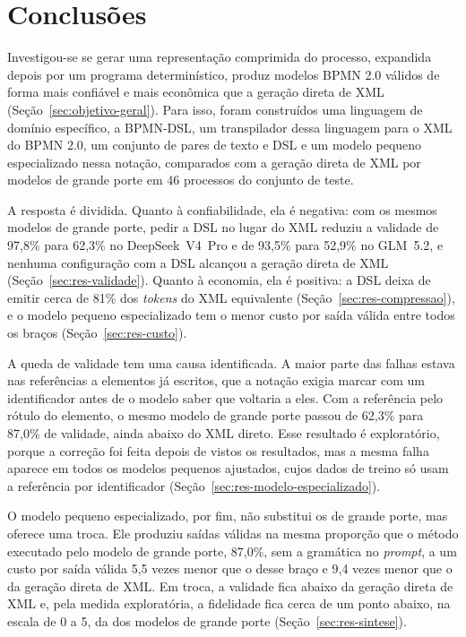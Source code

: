\chapter{Conclusões}\label{chap:conclusoes-e-trabalhos-futuros}

Investigou-se se gerar uma representação comprimida do processo, expandida depois por um programa determinístico, produz modelos BPMN 2.0 válidos de forma mais confiável e mais econômica que a geração direta de XML (Seção~\ref{sec:objetivo-geral}). Para isso, foram construídos uma linguagem de domínio específico, a BPMN-DSL, um transpilador dessa linguagem para o XML do BPMN 2.0, um conjunto de pares de texto e DSL e um modelo pequeno especializado nessa notação, comparados com a geração direta de XML por modelos de grande porte em 46 processos do conjunto de teste.

A resposta é dividida. Quanto à confiabilidade, ela é negativa: com os mesmos modelos de grande porte, pedir a DSL no lugar do XML reduziu a validade de 97,8\% para 62,3\% no DeepSeek~V4~Pro e de 93,5\% para 52,9\% no GLM~5.2, e nenhuma configuração com a DSL alcançou a geração direta de XML (Seção~\ref{sec:res-validade}). Quanto à economia, ela é positiva: a DSL deixa de emitir cerca de 81\% dos \textit{tokens} do XML equivalente (Seção~\ref{sec:res-compressao}), e o modelo pequeno especializado tem o menor custo por saída válida entre todos os braços (Seção~\ref{sec:res-custo}).

A queda de validade tem uma causa identificada. A maior parte das falhas estava nas referências a elementos já escritos, que a notação exigia marcar com um identificador antes de o modelo saber que voltaria a eles. Com a referência pelo rótulo do elemento, o mesmo modelo de grande porte passou de 62,3\% para 87,0\% de validade, ainda abaixo do XML direto. Esse resultado é exploratório, porque a correção foi feita depois de vistos os resultados, mas a mesma falha aparece em todos os modelos pequenos ajustados, cujos dados de treino só usam a referência por identificador (Seção~\ref{sec:res-modelo-especializado}).

O modelo pequeno especializado, por fim, não substitui os de grande porte, mas oferece uma troca. Ele produziu saídas válidas na mesma proporção que o método executado pelo modelo de grande porte, 87,0\%, sem a gramática no \textit{prompt}, a um custo por saída válida 5,5 vezes menor que o desse braço e 9,4 vezes menor que o da geração direta de XML. Em troca, a validade fica abaixo da geração direta de XML e, pela medida exploratória, a fidelidade fica cerca de um ponto abaixo, na escala de 0 a 5, da dos modelos de grande porte (Seção~\ref{sec:res-sintese}).

